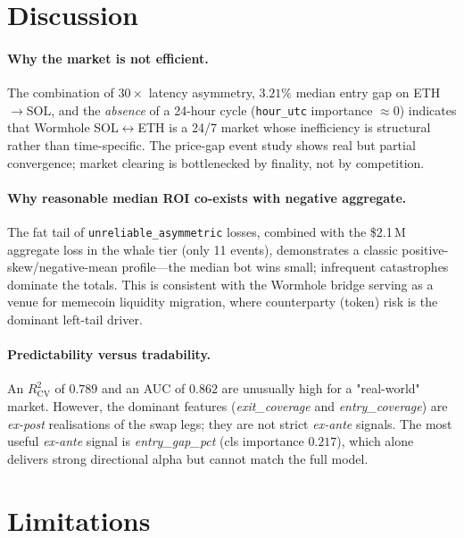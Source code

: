 \documentclass[11pt,a4paper]{article}
\begin{document}
\section{Discussion}\label{sec:disc}

\paragraph{Why the market is not efficient.} The combination of $30\times$
latency asymmetry, $3.21\%$ median entry gap on ETH$\to$SOL, and the
\emph{absence} of a 24-hour cycle (\texttt{hour\_utc} importance $\approx 0$)
indicates that Wormhole SOL$\leftrightarrow$ETH is a 24/7 market whose
inefficiency is structural rather than time-specific. The price-gap event
study shows real but partial convergence; market clearing is bottlenecked by
finality, not by competition.

\paragraph{Why reasonable median ROI co-exists with negative aggregate.} The
fat tail of \texttt{unreliable\_asymmetric} losses, combined with the
\$2.1\,M aggregate loss in the whale tier (only 11 events), demonstrates a
classic positive-skew/negative-mean profile---the median bot wins small;
infrequent catastrophes dominate the totals. This is consistent with the
Wormhole bridge serving as a venue for memecoin liquidity migration, where
counterparty (token) risk is the dominant left-tail driver.

\paragraph{Predictability versus tradability.} An $R^{2}_{\text{CV}}$ of
$0.789$ and an AUC of $0.862$ are unusually high for a "real-world" market.
However, the dominant features (\emph{exit\_coverage} and
\emph{entry\_coverage}) are \emph{ex-post} realisations of the swap legs;
they are not strict \emph{ex-ante} signals. The most useful \emph{ex-ante}
signal is \emph{entry\_gap\_pct} (cls importance $0.217$), which alone
delivers strong directional alpha but cannot match the full model.

\section{Limitations}\label{sec:limits}
\end{document}
